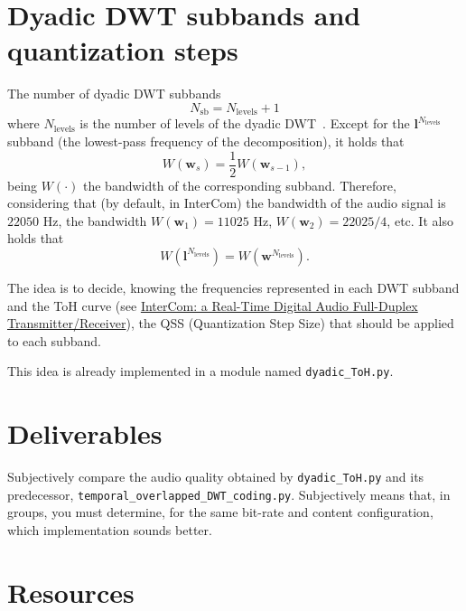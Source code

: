 \section{Dyadic DWT subbands and quantization steps}
The number of dyadic DWT subbands
\begin{equation}
  N_{\text{sb}} = N_{\text{levels}} + 1
\end{equation}
where $N_{\text{levels}}$ is the number of levels of the
dyadic DWT~\cite{vetterli1995wavelets}. Except for the
${\mathbf l}^{N_{\text{levels}}}$ subband (the lowest-pass frequency
of the decomposition), it holds that
\begin{equation}
  W({\mathbf w}_s) = \frac{1}{2}W({\mathbf w}_{s-1}),
\end{equation}
being $W(\cdot)$ the bandwidth of the corresponding
subband. Therefore, considering that (by default, in InterCom) the
bandwidth of the audio signal is $22050$ Hz, the bandwidth
$W({\mathbf w}_1)=11025$ Hz, $W({\mathbf w}_2)=22025/4$, etc. It also
holds that
\begin{equation}
  W({\mathbf l}^{N_{\text{levels}}}) = W({\mathbf w}^{N_{\text{levels}}}).
\end{equation}

The idea is to decide, knowing the frequencies represented in each DWT
subband and the ToH curve (see
\href{https://github.com/Tecnologias-multimedia/InterCom/blob/master/docs/2-hours_seminar.ipynb}{
  InterCom: a Real-Time Digital Audio Full-Duplex
  Transmitter/Receiver}), the QSS (Quantization Step Size) that should
be applied to each subband.

This idea is already implemented in a module named \verb|dyadic_ToH.py|.

\section{Deliverables}

Subjectively compare the audio quality obtained by
\verb|dyadic_ToH.py| and its predecessor,
\verb|temporal_overlapped_DWT_coding.py|. Subjectively means that, in
groups, you must determine, for the same bit-rate and content
configuration, which implementation sounds better.

\section{Resources}



